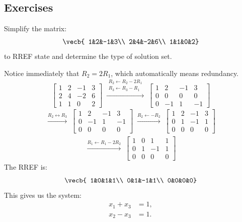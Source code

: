 \subsection*{Exercises}
\begin{Exercise}[title=Augmented Matrix 1, label=infinitelymany]
Simplify the matrix:
$$\vecb{
1&2&-1&3\\
2&4&-2&6\\
1&1&0&2}$$
to RREF state and determine the type of solution set.
\end{Exercise}
\begin{Answer}[ref=infinitelymany]
Notice immediately that $R_2 = 2R_1$, which automatically means redundancy. 
$$\begin{bmatrix}
1&2&-1&3\\
2&4&-2&6\\
1&1&0&2
\end{bmatrix}
\;\xrightarrow{\substack{R_2\leftarrow R_2-2R_1\\ R_3\leftarrow R_3-R_1}}\;
\begin{bmatrix}
1&2&-1&3\\
0&0&0&0\\
0&-1&1&-1
\end{bmatrix}$$
$$\begin{array}{c} \xrightarrow{R_2\leftrightarrow R_3}\;
\begin{bmatrix}
1&2&-1&3\\
0&-1&1&-1\\
0&0&0&0
\end{bmatrix}
\;\xrightarrow{R_2\leftarrow -R_2}\;
\begin{bmatrix}
1&2&-1&3\\
0&1&-1&1\\
0&0&0&0
\end{bmatrix} \end{array}$$
$$\begin{array}{c} \xrightarrow{R_1\leftarrow R_1-2R_2}\;
\boxed{
\begin{bmatrix}
1&0&1&1\\
0&1&-1&1\\
0&0&0&0
\end{bmatrix}} \end{array}$$
The RREF is:
$$\vecb{
1&0&1&1\\
0&1&-1&1\\
0&0&0&0}$$
This gives us the system:
$$\begin{aligned}
x_1 + x_3 &= 1,\\
x_2 - x_3 &= 1.
\end{aligned}$$

\end{Answer}
